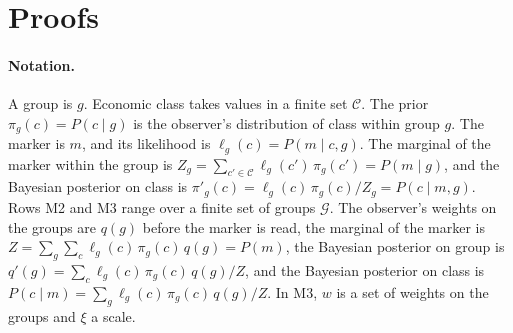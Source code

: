 


\appendix

\section{Proofs}
\label{app:proofs}

\paragraph{Notation.} A group is $g$. Economic class takes values in a finite
set $\mathcal{C}$. The prior $\pi_g(c)=P(c\mid g)$ is the observer's
distribution of class within group $g$. The marker is $m$, and its likelihood
is $\ell_g(c)=P(m\mid c,g)$. The marginal of the marker within the group is
$Z_g=\sum_{c'\in\mathcal{C}}\ell_g(c')\,\pi_g(c')=P(m\mid g)$, and the
Bayesian posterior on class is $\pi'_g(c)=\ell_g(c)\,\pi_g(c)/Z_g=P(c\mid m,g)$.
Rows M2 and M3 range over a finite set of groups $\mathcal{G}$. The
observer's weights on the groups are $q(g)$ before the marker is read, the
marginal of the marker is
$Z=\sum_{g}\sum_{c}\ell_g(c)\,\pi_g(c)\,q(g)=P(m)$, the Bayesian posterior on
group is $q'(g)=\sum_{c}\ell_g(c)\,\pi_g(c)\,q(g)/Z$, and the Bayesian
posterior on class is $P(c\mid m)=\sum_{g}\ell_g(c)\,\pi_g(c)\,q(g)/Z$. In M3,
$w$ is a set of weights on the groups and $\xi$ a scale.

